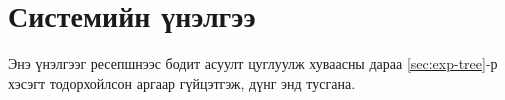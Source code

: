 
\section{Системийн үнэлгээ}
\label{sec:res-tree}

Энэ үнэлгээг ресепшнээс бодит асуулт цуглуулж хуваасны дараа \ref{sec:exp-tree}-р хэсэгт тодорхойлсон аргаар гүйцэтгэж, дүнг энд тусгана.
